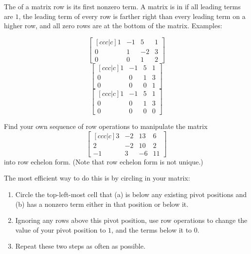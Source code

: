 \begin{applicationActivities}{2}{4}
\begin{definition}
  The  of a matrix row is its first nonzero term.
  A matrix is in  if all leading terms are \(1\),
  the leading term of every row
  is farther right than every leading term on a higher row, and all zero
  rows are at the bottom of the matrix. Examples:
  \begin{multicols}{3}\noindent
    \[
      \begin{bmatrix}[ccc|c]
        1 & -1 &  5 & 1 \\
        0 &  1 & -2 & 3 \\
        0 &  0 &  1 & 2
      \end{bmatrix}
    \]
    \[
      \begin{bmatrix}[ccc|c]
        1 & -1 &  5 & 1 \\
        0 &  0 &  1 & 3 \\
        0 &  0 &  0 & 1
      \end{bmatrix}
    \]
    \[
      \begin{bmatrix}[ccc|c]
        1 & -1 &  5 & 1 \\
        0 &  0 &  1 & 3 \\
        0 &  0 &  0 & 0
      \end{bmatrix}
    \]
  \end{multicols}
\end{definition}

\begin{activity}{10}
  Find your own sequence of row operations to manipulate the matrix
  \[
    \begin{bmatrix}[ccc|c]
      3 & -2 & 13 & 6 \\
      2 & -2 & 10 & 2 \\
      -1 & 3 & -6 & 11
    \end{bmatrix}
  \]
  into row echelon form. (Note that row echelon form is not unique.)

  The most efficient way to do this is by circling 
  in your matrix:
  \begin{enumerate}
    \item Circle the top-left-most cell that (a) is below any existing pivot
    positions and (b) has a nonzero term either in that position or below it.
    \item Ignoring any rows above this pivot position, use row operations
    to change the value of your pivot position to \(1\), and the terms below
    it to \(0\).
    \item Repeat these two steps as often as possible.
  \end{enumerate}
\end{activity}


\end{applicationActivities}

